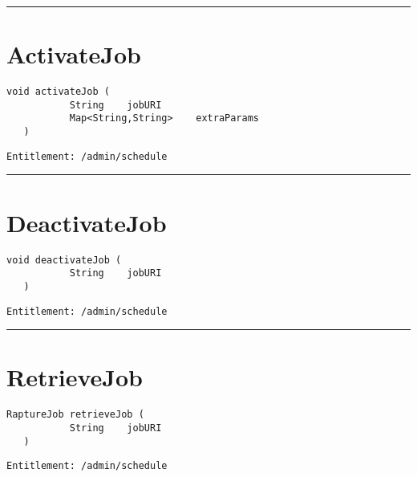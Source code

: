 \rule{12cm}{2pt}
\section{ActivateJob}
\label{Api:ActivateJob}
\begin{lstlisting}[style=nonumbers]
   void activateJob (
           String    jobURI
           Map<String,String>    extraParams
   )
\end{lstlisting}
\begin{Verbatim}[formatcom=\color{Maroon}]
  Entitlement: /admin/schedule
\end{Verbatim}



\rule{12cm}{2pt}
\section{DeactivateJob}
\label{Api:DeactivateJob}
\begin{lstlisting}[style=nonumbers]
   void deactivateJob (
           String    jobURI
   )
\end{lstlisting}
\begin{Verbatim}[formatcom=\color{Maroon}]
  Entitlement: /admin/schedule
\end{Verbatim}



\rule{12cm}{2pt}
\section{RetrieveJob}
\label{Api:RetrieveJob}
\begin{lstlisting}[style=nonumbers]
   RaptureJob retrieveJob (
           String    jobURI
   )
\end{lstlisting}
\begin{Verbatim}[formatcom=\color{Maroon}]
  Entitlement: /admin/schedule
\end{Verbatim}



